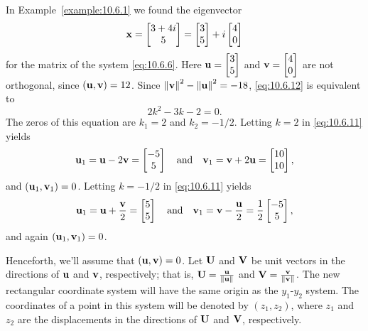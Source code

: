 \documentclass{ximera}
\begin{document}
\begin{example}\label{example:10.6.5}  
In Example~\ref{example:10.6.1}
we found the eigenvector
$$
{\bf x}=\begin{bmatrix}3+4i\\5\end{bmatrix}=\begin{bmatrix}3\\5\end{bmatrix}+i\begin{bmatrix}4\\0\end{bmatrix}
$$
for the matrix of the system \eqref{eq:10.6.6}. Here ${\bf u}=\begin{bmatrix}3\\5\end{bmatrix}$
and ${\bf v}=\begin{bmatrix}4\\0\end{bmatrix}$ are not orthogonal, since $({\bf u},{\bf
v})=12$. Since $\left\lVert{\bf v}\right\rVert^2-\left\lVert{\bf u}\right\rVert^2=-18$, \eqref{eq:10.6.12} is
equivalent to
$$
2k^2-3k-2=0.
$$
The zeros of this equation are $k_1=2$ and $k_2=-1/2$. Letting $k=2$
in \eqref{eq:10.6.11} yields
$$
{\bf u}_1={\bf u}-2{\bf v}=\begin{bmatrix}-5\\5\end{bmatrix}\quad\mbox{and}\quad
{\bf v}_1={\bf v}+2{\bf u}=\begin{bmatrix}10\\10\end{bmatrix},
$$
and $({\bf u}_1,{\bf v}_1)=0$.
 Letting $k=-1/2$
in \eqref{eq:10.6.11} yields
$$
{\bf u}_1={\bf u}+\frac{{\bf v}}{2}=\begin{bmatrix}5\\5\end{bmatrix}\quad\mbox{and}\quad
{\bf v}_1={\bf v}-\frac{{\bf u}}{2}=\frac{1}{2}\begin{bmatrix}-5\\5\end{bmatrix},
$$
and again $({\bf u}_1,{\bf v}_1)=0$.
\end{example}


Henceforth, we'll assume that $({\bf u},{\bf v})=0$. Let ${\bf U}$ and
${\bf V}$ be unit vectors in the directions of ${\bf u}$ and ${\bf v}$, respectively; that is, ${\bf U}=\frac{{\bf u}}{\left\lVert{\bf u}\right\rVert}$ and ${\bf
V}=\frac{{\bf v}}{\left\lVert{\bf v}\right\rVert}$. The new rectangular coordinate system will
have the same origin as the $y_1$-$y_2$ system. The coordinates of a
point in this system will be denoted by $(z_1,z_2)$, where $z_1$ and
$z_2$ are the displacements in the directions of ${\bf U}$ and ${\bf
V}$, respectively.
\end{document}
